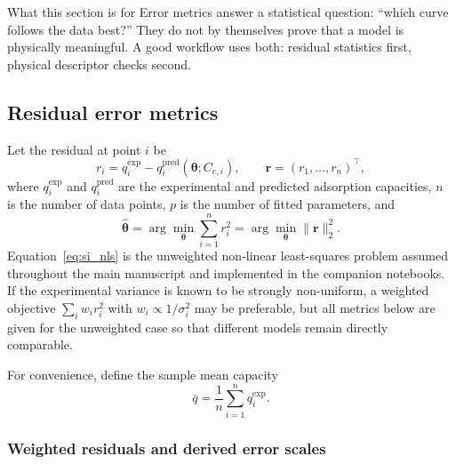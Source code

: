 \documentclass[journal=jacsat,manuscript=article]{achemso}
\begin{document}
\begin{bluebox}{What this section is for}
	Error metrics answer a statistical question: ``which curve follows the
	data best?'' They do not by themselves prove that a model is physically
	meaningful. A good workflow uses both: residual statistics first,
	physical descriptor checks second.
\end{bluebox}

\subsection{Residual error metrics}
\label{sec:si_residuals}

Let the residual at point $i$ be
\begin{equation}
	r_i = q_i^{\exp} - q_i^{\mathrm{pred}}(\boldsymbol{\theta}; C_{e,i}),
	\qquad
	\mathbf{r} = (r_1,\dots,r_n)^\top,
	\label{eq:si_residual_vector}
\end{equation}
where $q_i^{\exp}$ and $q_i^{\mathrm{pred}}$ are the experimental and
predicted adsorption capacities, $n$ is the number of data points, $p$
is the number of fitted parameters, and
\begin{equation}
	\hat{\boldsymbol{\theta}}
	=
	\arg\min_{\boldsymbol{\theta}}
	\sum_{i=1}^{n} r_i^2
	=
	\arg\min_{\boldsymbol{\theta}} \|\mathbf{r}\|_2^2.
	\label{eq:si_nls}
\end{equation}
Equation~\eqref{eq:si_nls} is the unweighted non-linear least-squares
problem assumed throughout the main manuscript and implemented in the
companion notebooks. If the experimental variance is known to be
strongly non-uniform, a weighted objective
$\sum_i w_i r_i^2$ with $w_i \propto 1/\sigma_i^2$ may be preferable,
but all metrics below are given for the unweighted case so that
different models remain directly comparable.

For convenience, define the sample mean capacity
\begin{equation}
	\bar{q} = \frac{1}{n}\sum_{i=1}^{n} q_i^{\exp}.
	\label{eq:si_qbar}
\end{equation}

\subsubsection{Weighted residuals and derived error scales}
\end{document}
